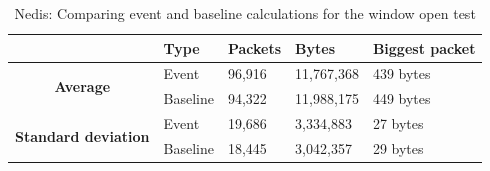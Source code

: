 \begin{table}[H]
    \centering
    \caption{Nedis: Comparing event and baseline calculations for the window open test}
    \begin{tabular}{c|l|l|l|l|}
        \cline{2-5}
        \multicolumn{1}{l|}{}                                              & \textbf{Type} & \textbf{Packets} & \textbf{Bytes} & \textbf{Biggest packet} \\ \hline
        \multicolumn{1}{|c|}{\multirow{2}{*}{\textbf{Average}}}            & Event         & 96,916             & 11,767,368      & 439 bytes               \\ \cline{2-5} 
        \multicolumn{1}{|c|}{}                                             & Baseline      & 94,322             & 11,988,175      & 449 bytes                \\ \hline
        \multicolumn{1}{|c|}{\multirow{2}{*}{\textbf{Standard deviation}}} & Event         & 19,686             & 3,334,883       & 27 bytes                 \\ \cline{2-5} 
        \multicolumn{1}{|c|}{}                                             & Baseline      & 18,445             & 3,042,357       & 29 bytes               \\ \hline          
    \end{tabular}
    \label{tab:NedisComparingBaselineAndWindowCalculations}
\end{table}

